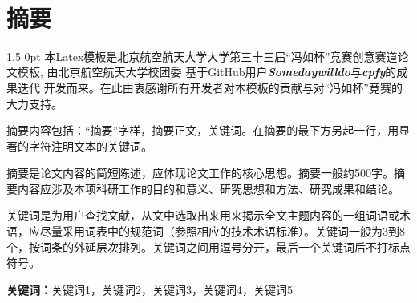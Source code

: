 \documentclass[zihao=-4]{ctexart}
\newcommand{\sanhao}{\fontsize{16pt}{0}}
\newcommand{\xiaosi}{\fontsize{12pt}{0}}
\newcommand{\setParDis}{\setlength {\parskip} {0pt} }
\begin{document}
\par \ 
\begin{center}
\sanhao
\centerline{\heiti{}}%
\end{center}



\renewcommand{\headrulewidth}{0pt}%
\clearpage
{} %

\xiaosi
\section*{摘要}
\begin{spacing}{1.5}
  \setParDis %
  本Latex模板是北京航空航天大学大学第三十三届“冯如杯”竞赛创意赛道论文模板, 由北京航空航天大学校团委
基于GitHub用户\textbf{\textit{Somedaywilldo}}与\textbf{\textit{cpfy}}的成果迭代
开发而来。在此由衷感谢所有开发者对本模板的贡献与对“冯如杯”竞赛的大力支持。

摘要内容包括：“摘要”字样，摘要正文，关键词。在摘要的最下方另起一行，用显著的字符注明文本的关键词。

摘要是论文内容的简短陈述，应体现论文工作的核心思想。摘要一般约500字。摘要内容应涉及本项科研工作的目的和意义、研究思想和方法、研究成果和结论。

关键词是为用户查找文献，从文中选取出来用来揭示全文主题内容的一组词语或术语，应尽量采用词表中的规范词（参照相应的技术术语标准）。关键词一般为3到8个，按词条的外延层次排列。关键词之间用逗号分开，最后一个关键词后不打标点符号。

\end{spacing}
    
\textbf{关键词：}关键词1，关键词2，关键词3，关键词4，关键词5

\newpage
\end{document}
